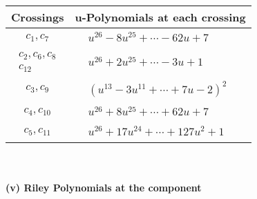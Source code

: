 \documentclass[1p]{elsarticle_modified}
\theoremstyle{definition}
\begin{document}
\begin{tabular}{m{50pt}|m{274pt}}
Crossings & \hspace{64pt}u-Polynomials at each crossing \\
\hline $$\begin{aligned}c_{1},c_{7}\end{aligned}$$&$\begin{aligned}
&u^{26}-8 u^{25}+\cdots-62 u+7
\end{aligned}$\\
\hline $$\begin{aligned}c_{2},c_{6},c_{8}\\c_{12}\end{aligned}$$&$\begin{aligned}
&u^{26}+2 u^{25}+\cdots-3 u+1
\end{aligned}$\\
\hline $$\begin{aligned}c_{3},c_{9}\end{aligned}$$&$\begin{aligned}
&(u^{13}-3 u^{11}+\cdots+7 u-2)^{2}
\end{aligned}$\\
\hline $$\begin{aligned}c_{4},c_{10}\end{aligned}$$&$\begin{aligned}
&u^{26}+8 u^{25}+\cdots+62 u+7
\end{aligned}$\\
\hline $$\begin{aligned}c_{5},c_{11}\end{aligned}$$&$\begin{aligned}
&u^{26}+17 u^{24}+\cdots+127 u^2+1
\end{aligned}$\\
\hline
\end{tabular}\\~\\
\newpage\renewcommand{\arraystretch}{1}
\flushleft \textbf{(v) Riley Polynomials at the component}\newline \\
\end{document}
